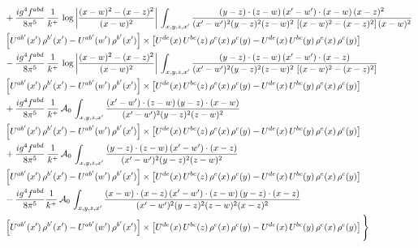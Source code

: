 \documentclass[9pt]{article}
\numberwithin{equation}{section}
\begin{document}
\begin{align}
& +\frac{ig^{4}f^{abd}}{8\pi^{5}}\,\frac{1}{k^{+}}\,\log{\left|\frac{(x-w)^{2}-(x-z)^{2}}{(x-w)^{2}}\right|}\,\int_{x,y,z,x'}
\frac{(y-z)\cdot(z-w)\,(x'-w')\cdot(x-w)\,(x-z)^{2}}{(x'-w')^{2}(y-z)^{2}(z-w)^{2}\,\left[(x-w)^{2}-(x-z)^{2}\right](x-w)^{2}}\notag \\ 
& \left[U^{ab'}(x')\,\rho^{b'}(x')-U^{ab'}(w')\, \rho^{b'}(x')\right]\times \left[U^{de}(x)\,U^{bc}(z)\, \rho^{e}(x)\,\rho^{c}(y)-U^{de}(x)\,U^{bc}(y)\,\rho^{e}(x)\,\rho^{c}(y)\right] \notag \\
& -\frac{ig^{4}f^{abd}}{8\pi^{5}}\,\frac{1}{k^{+}}\,\log{\left|\frac{(x-w)^{2}-(x-z)^{2}}{(x-w)^{2}}\right|}\,\int_{x,y,z,x'}
\frac{(y-z)\cdot(z-w)\,(x'-w')\cdot(x-z)}{(x'-w')^{2}(y-z)^{2}(z-w)^{2}\,\left[(x-w)^{2}-(x-z)^{2}\right]}\notag \\ & \left[U^{ab'}(x')\,\rho^{b'}(x')-U^{ab'}(w')\, \rho^{b'}(x')\right]\times \left[U^{de}(x)\,U^{bc}(z)\, \rho^{e}(x)\,\rho^{c}(y)-U^{de}(x)\,U^{bc}(y)\,\rho^{e}(x)\,\rho^{c}(y)\right] \notag \\
& +\frac{ig^{4}f^{abd}}{8\pi^{5}}\,\frac{1}{k^{+}}\,\mathcal{A}_{0}\,\int_{x,y,z,x'}
\frac{(x'-w')\cdot(z-w)\,(y-z)\cdot(x-w)}{(x'-w')^{2}(y-z)^{2}(z-w)^{2}}\notag \\
& \left[U^{ab'}(x')\,\rho^{b'}(x')-U^{ab'}(w')\, \rho^{b'}(x')\right]\times \left[U^{de}(x)\,U^{bc}(z)\, \rho^{e}(x)\,\rho^{c}(y)-U^{de}(x)\,U^{bc}(y)\,\rho^{e}(x)\,\rho^{c}(y)\right] \notag \\
& +\frac{ig^{4}f^{abd}}{8\pi^{5}}\,\frac{1}{k^{+}}\,\mathcal{A}_{0}\,\int_{x,y,z,x'}
\frac{(y-z)\cdot(z-w)\,(x'-w')\cdot(x-z)}{(x'-w')^{2}(y-z)^{2}(z-w)^{2}}\notag \\ & \left[U^{ab'}(x')\,\rho^{b'}(x')-U^{ab'}(w')\, \rho^{b'}(x')\right]\times \left[U^{de}(x)\,U^{bc}(z)\, \rho^{e}(x)\,\rho^{c}(y)-U^{de}(x)\,U^{bc}(y)\,\rho^{e}(x)\,\rho^{c}(y)\right] \notag \\
& -\frac{ig^{4}f^{abd}}{8\pi^{5}}\frac{1}{k^{+}}\,\mathcal{A}_{0}\,\int_{x,y,z,x'}
\frac{(x-w)\cdot(x-z)\,(x'-w')\cdot(z-w)\,(y-z)\cdot(x-z)}{(x'-w')^{2}(y-z)^{2}(z-w)^{2}(x-z)^{2}}\notag \\ & \left[U^{ab'}(x')\,\rho^{b'}(x')-U^{ab'}(w')\, \rho^{b'}(x')\right]\times \left[U^{de}(x)\,U^{bc}(z)\, \rho^{e}(x)\,\rho^{c}(y)-U^{de}(x)\,U^{bc}(y)\,\rho^{e}(x)\,\rho^{c}(y)\right]\Bigg\}
\end{align}
\end{document}
